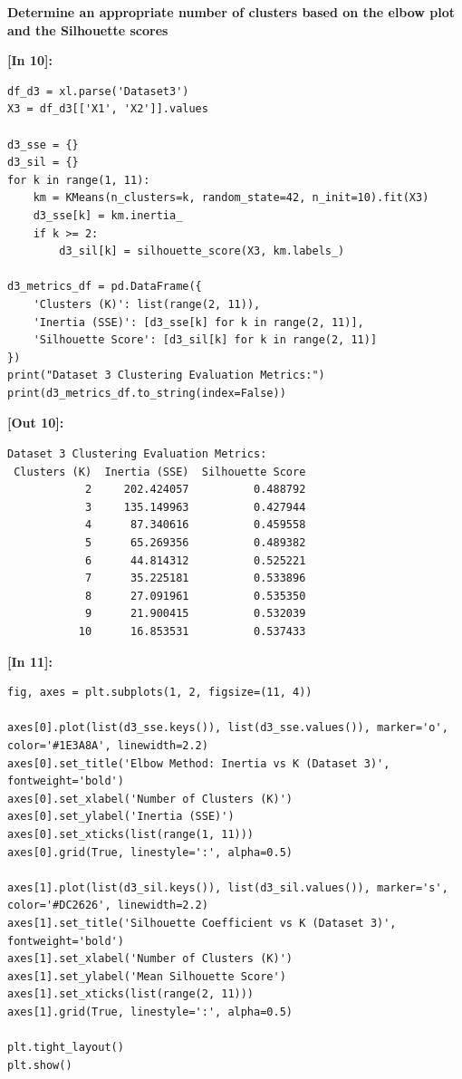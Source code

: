\vspace{0.3em}
\begin{tcolorbox}[colback=gray!5!white,colframe=gray!50!black,boxrule=0.5pt,arc=2pt,left=4pt,right=4pt,top=2pt,bottom=2pt,unbreakable,before upper={\sloppy\raggedright}]
{\small\bfseries Determine an appropriate number of clusters based on the elbow plot and the Silhouette scores\par}
\end{tcolorbox}

\vspace{0.4em}
\noindent\textbf{\small [In 10]:}
\begin{lstlisting}[style=pycode]
df_d3 = xl.parse('Dataset3')
X3 = df_d3[['X1', 'X2']].values

d3_sse = {}
d3_sil = {}
for k in range(1, 11):
    km = KMeans(n_clusters=k, random_state=42, n_init=10).fit(X3)
    d3_sse[k] = km.inertia_
    if k >= 2:
        d3_sil[k] = silhouette_score(X3, km.labels_)

d3_metrics_df = pd.DataFrame({
    'Clusters (K)': list(range(2, 11)),
    'Inertia (SSE)': [d3_sse[k] for k in range(2, 11)],
    'Silhouette Score': [d3_sil[k] for k in range(2, 11)]
})
print("Dataset 3 Clustering Evaluation Metrics:")
print(d3_metrics_df.to_string(index=False))
\end{lstlisting}
\noindent\textbf{\small [Out 10]:}
\begin{lstlisting}[style=output]
Dataset 3 Clustering Evaluation Metrics:
 Clusters (K)  Inertia (SSE)  Silhouette Score
            2     202.424057          0.488792
            3     135.149963          0.427944
            4      87.340616          0.459558
            5      65.269356          0.489382
            6      44.814312          0.525221
            7      35.225181          0.533896
            8      27.091961          0.535350
            9      21.900415          0.532039
           10      16.853531          0.537433
\end{lstlisting}

\vspace{0.4em}
\noindent\textbf{\small [In 11]:}
\begin{lstlisting}[style=pycode]
fig, axes = plt.subplots(1, 2, figsize=(11, 4))

axes[0].plot(list(d3_sse.keys()), list(d3_sse.values()), marker='o', color='#1E3A8A', linewidth=2.2)
axes[0].set_title('Elbow Method: Inertia vs K (Dataset 3)', fontweight='bold')
axes[0].set_xlabel('Number of Clusters (K)')
axes[0].set_ylabel('Inertia (SSE)')
axes[0].set_xticks(list(range(1, 11)))
axes[0].grid(True, linestyle=':', alpha=0.5)

axes[1].plot(list(d3_sil.keys()), list(d3_sil.values()), marker='s', color='#DC2626', linewidth=2.2)
axes[1].set_title('Silhouette Coefficient vs K (Dataset 3)', fontweight='bold')
axes[1].set_xlabel('Number of Clusters (K)')
axes[1].set_ylabel('Mean Silhouette Score')
axes[1].set_xticks(list(range(2, 11)))
axes[1].grid(True, linestyle=':', alpha=0.5)

plt.tight_layout()
plt.show()
\end{lstlisting}

